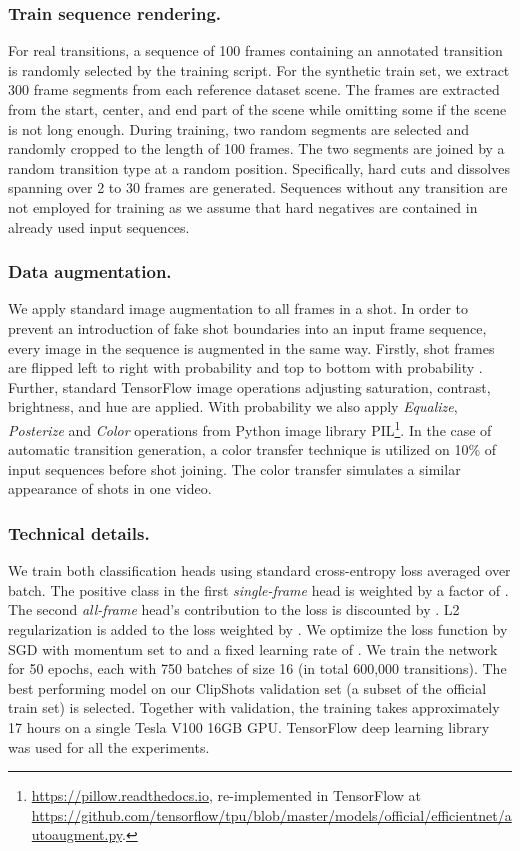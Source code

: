 \documentclass[sigconf]{acmart}
\begin{document}
\subsubsection{Train sequence rendering.}
For real transitions, a sequence of 100 frames containing an annotated transition is randomly selected by the training script.
For the synthetic train set, we extract 300 frame segments from each reference dataset scene. The frames are extracted from the start, center, and end part of the scene while omitting some if the scene is not long enough. During training, two random segments are selected and randomly cropped to the length of 100 frames. The two segments are joined by a random transition type at a random position. Specifically, hard cuts and dissolves spanning over 2 to 30 frames are generated. Sequences without any transition are not employed for training as we assume that hard negatives are contained in already used input sequences.

\subsubsection{Data augmentation.}
We apply standard image augmentation to all frames in a shot. In order to prevent an introduction of fake shot boundaries into an input frame sequence, every image in the sequence is augmented in the same way. Firstly, shot frames are flipped left to right with probability  and top to bottom with probability . Further, standard TensorFlow image operations adjusting saturation, contrast, brightness, and hue are applied. With probability  we also apply \textit{Equalize}, \textit{Posterize} and \textit{Color} operations from Python image library PIL\footnote{\url{https://pillow.readthedocs.io}, re-implemented in TensorFlow at \url{https://github.com/tensorflow/tpu/blob/master/models/official/efficientnet/autoaugment.py}.}. In the case of automatic transition generation, a color transfer technique is utilized on 10\% of input sequences before shot joining. The color transfer simulates a similar appearance of shots in one video.

\subsubsection{Technical details.}
We train both classification heads using standard cross-entropy loss averaged over batch. The positive class in the first \textit{single-frame} head is weighted by a factor of . The second \textit{all-frame} head's contribution to the loss is discounted by . L2 regularization is added to the loss weighted by . We optimize the loss function by SGD with momentum set to  and a fixed learning rate of . We train the network for 50 epochs, each with 750 batches of size 16 (in total 600,000 transitions). The best performing model on our ClipShots validation set (a subset of the official train set) is selected. Together with validation, the training takes approximately 17 hours on a single Tesla V100 16GB GPU. TensorFlow deep learning library was used for all the experiments.
\end{document}
